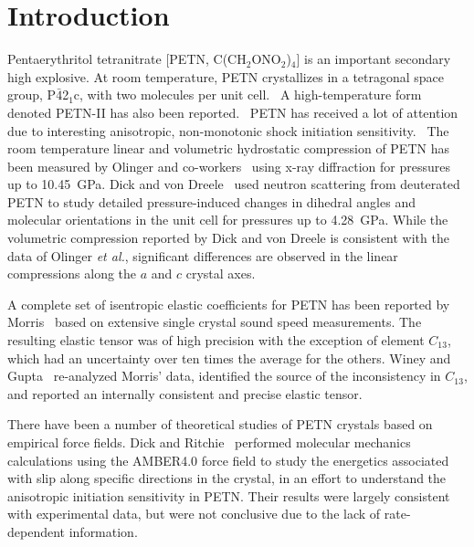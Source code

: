 \documentclass[prb,aps,nobibnotes,superbib,preprint]{revtex4}
\begin{document}
\section{Introduction}
Pentaerythritol tetranitrate [PETN, C(CH$_2$ONO$_2$)$_4$] is an
important secondary high explosive.  At room temperature, PETN
crystallizes in a tetragonal space group, P$\bar{4}$2$_1$c, with two
molecules per unit
cell.~\cite{Booth_1947v,Trotter_1963v16,Conant_1979} A
high-temperature form denoted PETN-II has also been
reported.~\cite{Cady_1975vB41} PETN has received a lot of attention
due to interesting anisotropic, non-monotonic shock initiation
sensitivity.~\cite{Dick_1984v44,Dick_1991v70,Gallagher_1992v339,Dick_1997v81,Gruzdkov_2000v104,Yoo_2000v88}
The room temperature linear and volumetric hydrostatic compression of
PETN has been measured by Olinger and
co-workers~\cite{Olinger_1975v62,Olinger_1976} using x-ray diffraction
for pressures up to 10.45~GPa.  Dick and von Dreele~\cite{Dick_1997}
used neutron scattering from deuterated PETN to study detailed
pressure-induced changes in dihedral angles and molecular orientations
in the unit cell for pressures up to 4.28~GPa.
While the volumetric compression reported by Dick and von Dreele is
consistent with the data of Olinger {\it et al.}, significant
differences are observed in the linear compressions along the $a$ and
$c$ crystal axes.

A complete set of isentropic elastic coefficients for PETN has been
reported by Morris~\cite{Morris_1976} based on extensive single
crystal sound speed measurements.  The resulting elastic tensor was of
high precision with the exception of element $C_{13}$, which had an
uncertainty over ten times the average for the others.  Winey and
Gupta~\cite{Winey_2001v90} re-analyzed Morris' data, identified the
source of the inconsistency in $C_{13}$, and reported an internally
consistent and precise elastic tensor.

There have been a number of theoretical studies of PETN crystals based
on empirical force fields.  Dick and
Ritchie~\cite{Dick_1994v76} performed molecular mechanics calculations
using the AMBER4.0 force field to study the energetics associated with
slip along specific directions in the crystal, in an effort to
understand the anisotropic initiation sensitivity in PETN.  Their
results were largely consistent with experimental data, but were not
conclusive due to the lack of rate-dependent information.
\end{document}
